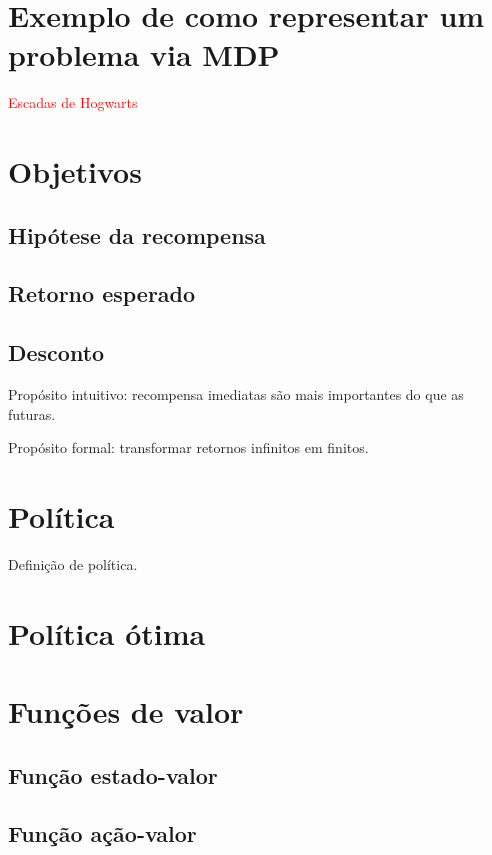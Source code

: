 \documentclass{article}
\begin{document}
\section{Exemplo de como representar um problema via MDP}

    \textcolor{red}{Escadas de Hogwarts}

\section{Objetivos}

    \subsection{Hipótese da recompensa}

    \subsection{Retorno esperado}
    
    \subsection{Desconto}
    
        Propósito intuitivo: recompensa imediatas são mais importantes do que as futuras.
        
        Propósito formal: transformar retornos infinitos em finitos.
    
\section{Política}

    Definição de política.

    \section{Política ótima}
    

\section{Funções de valor}
    
    \subsection{Função estado-valor}
    
    \subsection{Função ação-valor}
    
\end{document}
